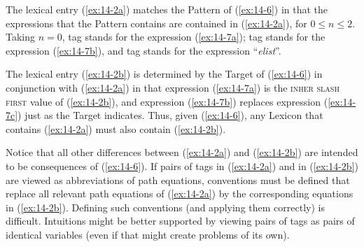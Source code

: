 \documentclass[output=paper]{LSP/langsci}
\begin{document}
\randnum\label{rn:14-15}The lexical entry (\ref{ex:14-2a}) matches the Pattern of
(\ref{ex:14-6}) in that the expressions that the Pattern contains are contained
in (\ref{ex:14-2a}), for $0 \leq n \leq 2$. Taking $n = 0$, tag  stands for the expression (\ref{ex:14-7a}); tag  stands for the expression (\ref{ex:14-7b}), and tag 
stands for the expression ``\textit{elist}''.
\begin{exe}
\ex
\label{ex:14-7}
\begin{xlist}
\ex
{}
\label{ex:14-7a}
\ex
{}
\label{ex:14-7b}
\ex
{}
\label{ex:14-7c}
\end{xlist}
\end{exe}
The lexical entry (\ref{ex:14-2b}) is determined by the Target of (\ref{ex:14-6}) in
conjunction with (\ref{ex:14-2a}) in that expression (\ref{ex:14-7a}) is the \textsc{inher} \textsc{slash} \textsc{first}
value of (\ref{ex:14-2b}), and expression (\ref{ex:14-7b}) replaces expression (\ref{ex:14-7c}) just as
the Target indicates. Thus, given (\ref{ex:14-6}), any Lexicon that contains (\ref{ex:14-2a})
must also contain (\ref{ex:14-2b}).

\randnum\label{rn:14-16}Notice that all other differences between (\ref{ex:14-2a})
and (\ref{ex:14-2b}) are intended to be consequences of (\ref{ex:14-6}). If pairs of tags in
(\ref{ex:14-2a}) and in (\ref{ex:14-2b}) are viewed as abbreviations of path equations,
conventions must be defined that replace all relevant path equations
of (\ref{ex:14-2a}) by the corresponding equations in (\ref{ex:14-2b}). Defining such
conventions (and applying them correctly) is difficult. Intuitions
might be better supported by viewing pairs of tags as pairs of
identical variables (even if that might create problems of its own).
\end{document}
